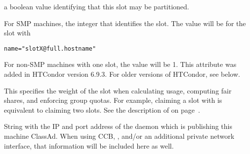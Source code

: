 \begin{description}
a boolean value identifying that this slot may be partitioned.
%
\item[\AdAttr{SlotID}:] For SMP machines, the integer
that identifies the slot.
The value will be \verb@X@ for the slot with 
\begin{verbatim}
name="slotX@full.hostname"
\end{verbatim}
For non-SMP machines with one slot, the value will be 1.
\Note This attribute was added in HTCondor version 6.9.3.
For older versions of HTCondor, see  below.
%
\item[\AdAttr{SlotWeight}:]
  This specifies the weight of the slot when
  calculating usage, computing fair shares, and enforcing group
  quotas.  For example, claiming a slot with  is
  equivalent to claiming two  slots.
  See the description of  on
  page~\pageref{param:SlotWeight}.

%
\item[\AdAttr{StartdIpAddr}:] String with the IP and port address of the
 daemon which is publishing this machine ClassAd.
When using CCB, , and/or an additional private
network interface, that information will be included here as well.


\end{description}
